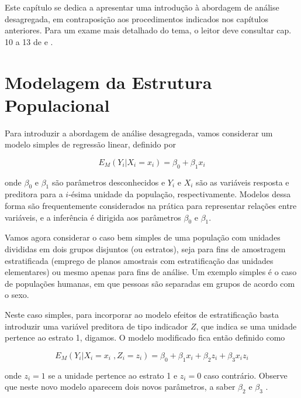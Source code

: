 \documentclass[]{book}
\numberwithin{example}{chapter}
\numberwithin{remark}{chapter}
\numberwithin{definition}{chapter}
\begin{document}
Este capítulo se dedica a apresentar uma introdução à abordagem de
análise desagregada, em contraposição aos procedimentos indicados nos
capítulos anteriores. Para um exame mais detalhado do tema, o leitor
deve consultar cap. 10 a 13 de \citep{Sk89a} e \citep{bryk}.

\section{Modelagem da Estrutura
Populacional}\label{modelagem-da-estrutura-populacional}

Para introduzir a abordagem de análise desagregada, vamos considerar um
modelo simples de regressão linear, definido por

\begin{equation}
E_{M}\left( Y_{i}\left| X_{i}=x_{i}\right. \right) =\beta _{0}+\beta
_{1}x_{i}  \label{eq:hier1}
\end{equation}

onde \(\beta _{0}\) e \(\beta _{1}\) são parâmetros desconhecidos e
\(Y_{i}\) e \(X_{i}\) são as variáveis resposta e preditora para a
\(i\)-ésima unidade da população, respectivamente. Modelos dessa forma
são frequentemente considerados na prática para representar relações
entre variáveis, e a inferência é dirigida aos parâmetros \(\beta _{0}\)
e \(\beta _{1}.\)

Vamos agora considerar o caso bem simples de uma população com unidades
divididas em dois grupos disjuntos (ou estratos), seja para fins de
amostragem estratificada (emprego de planos amostrais com estratificação
das unidades elementares) ou mesmo apenas para fins de análise. Um
exemplo simples é o caso de populações humanas, em que pessoas são
separadas em grupos de acordo com o sexo.

Neste caso simples, para incorporar ao modelo efeitos de estratificação
basta introduzir uma variável preditora de tipo indicador \(Z\), que
indica se uma unidade pertence ao estrato 1, digamos. O modelo
modificado fica então definido como

\begin{equation}
E_{M}\left( Y_{i}\left| X_{i}=x_{i}\;,Z_{i}=z_{i}\right. \right) =\beta
_{0}+\beta _{1}x_{i}+\beta _{2}z_{i}+\beta _{3}x_{i}z_{i}  \label{eq:hier2}
\end{equation}

onde \(z_{i}=1\) se a unidade pertence ao estrato 1 e \(z_{i}=0\) caso
contrário. Observe que neste novo modelo aparecem dois novos parâmetros,
a saber \(\beta _{2}\) e \(\beta _{3}\) .
\end{document}
